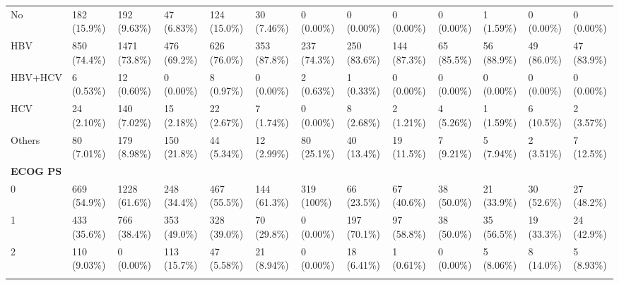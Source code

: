 \documentclass{article}
\begin{document}
\begin{landscape}
\begin{tiny}
\begin{tabularx}{\linewidth}{p{2.0cm}|X|X|X|X|X|X|X|X|X|X|X|X}
\rowcolor{gray!10}
    No &   182 (15.9\%)    &   192 (9.63\%)    &    47 (6.83\%)    &   124 (15.0\%)    &    30 (7.46\%)    &    0 (0.00\%)     &    0 (0.00\%)     &    0 (0.00\%)     &    0 (0.00\%)     &    1 (1.59\%)     &    0 (0.00\%)     &    0 (0.00\%)     \\
\rowcolor{gray!10}
    HBV &   850 (74.4\%)    &   1471 (73.8\%)   &   476 (69.2\%)    &   626 (76.0\%)    &   353 (87.8\%)    &   237 (74.3\%)    &   250 (83.6\%)    &   144 (87.3\%)    &    65 (85.5\%)    &    56 (88.9\%)    &    49 (86.0\%)    &    47 (83.9\%)    \\
\rowcolor{gray!10}
    HBV+HCV &    6 (0.53\%)     &    12 (0.60\%)    &    0 (0.00\%)     &    8 (0.97\%)     &    0 (0.00\%)     &    2 (0.63\%)     &    1 (0.33\%)     &    0 (0.00\%)     &    0 (0.00\%)     &    0 (0.00\%)     &    0 (0.00\%)     &    0 (0.00\%)     \\
\rowcolor{gray!10}
    HCV &    24 (2.10\%)    &   140 (7.02\%)    &    15 (2.18\%)    &    22 (2.67\%)    &    7 (1.74\%)     &    0 (0.00\%)     &    8 (2.68\%)     &    2 (1.21\%)     &    4 (5.26\%)     &    1 (1.59\%)     &    6 (10.5\%)     &    2 (3.57\%)     \\
\rowcolor{gray!10}
    Others &    80 (7.01\%)    &   179 (8.98\%)    &   150 (21.8\%)    &    44 (5.34\%)    &    12 (2.99\%)    &    80 (25.1\%)    &    40 (13.4\%)    &    19 (11.5\%)    &    7 (9.21\%)     &    5 (7.94\%)     &    2 (3.51\%)     &    7 (12.5\%)     \\
\rowcolor{gray!30}
\textbf{ECOG PS }  &  &  &  &  &  &  &  &  &  &  &  &  \\
\rowcolor{gray!10}
    0 &   669 (54.9\%)    &   1228 (61.6\%)   &   248 (34.4\%)    &   467 (55.5\%)    &   144 (61.3\%)    &    319 (100\%)    &    66 (23.5\%)    &    67 (40.6\%)    &    38 (50.0\%)    &    21 (33.9\%)    &    30 (52.6\%)    &    27 (48.2\%)    \\
\rowcolor{gray!10}
    1 &   433 (35.6\%)    &   766 (38.4\%)    &   353 (49.0\%)    &   328 (39.0\%)    &    70 (29.8\%)    &    0 (0.00\%)     &   197 (70.1\%)    &    97 (58.8\%)    &    38 (50.0\%)    &    35 (56.5\%)    &    19 (33.3\%)    &    24 (42.9\%)    \\
\rowcolor{gray!10}
    2 &   110 (9.03\%)    &    0 (0.00\%)     &   113 (15.7\%)    &    47 (5.58\%)    &    21 (8.94\%)    &    0 (0.00\%)     &    18 (6.41\%)    &    1 (0.61\%)     &    0 (0.00\%)     &    5 (8.06\%)     &    8 (14.0\%)     &    5 (8.93\%)     \\
\rowcolor{gray!10}

\end{tabularx}
\end{tiny}
\end{landscape}
\end{document}
